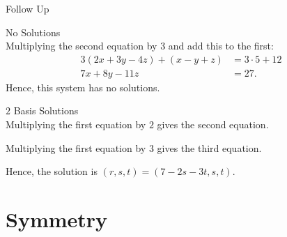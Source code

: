 \documentclass[xcolor=dvipsnames, fontsize=11pt, %
pagesize, %
parskip=half-, t]{beamer}
\begin{document}
\begin{frame}[c]{Follow Up}
	\centering
\end{frame}

\begin{frame}{No Solutions}
	 ~\\
		
		Multiplying the second equation by $3$ and add this to the first:
		\begin{align*} 3\left(2x+3y-4z\right)+\left(x-y+z\right)&=3\cdot 5+12 \\
					7x+8y-11z &=27. \end{align*}
		Hence, this system has no solutions.
\end{frame}

\begin{frame}{$2$ Basis Solutions}
	 ~\\
			
Multiplying the first equation by $2$ gives the second equation. \medskip \pause

Multiplying the first equation by $3$ gives the third equation. \medskip \pause

Hence, the solution is $(r, s, t)=(7-2s-3t, s, t)$. 
\end{frame}

\section{Symmetry}
\end{document}
